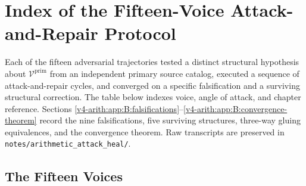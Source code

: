 \chapter{Index of the Fifteen-Voice Attack-and-Repair Protocol}
\label{v4-arith:app:fifteen-voices}

Each of the fifteen adversarial trajectories tested a distinct
structural hypothesis about $\mathcal{V}^{\mathrm{prim}}$ from an
independent primary source catalog, executed a sequence of
attack-and-repair cycles, and converged on a specific falsification
and a surviving structural correction. The table below indexes
voice, angle of attack, and chapter reference. Sections
\ref{v4-arith:app:B:falsifications}--\ref{v4-arith:app:B:convergence-theorem}
record the nine falsifications, five surviving structures,
three-way gluing equivalences, and the convergence theorem.
Raw transcripts are preserved in
\texttt{notes/arithmetic\_attack\_heal/}.

\section{The Fifteen Voices}
\label{v4-arith:app:B:fifteen}

